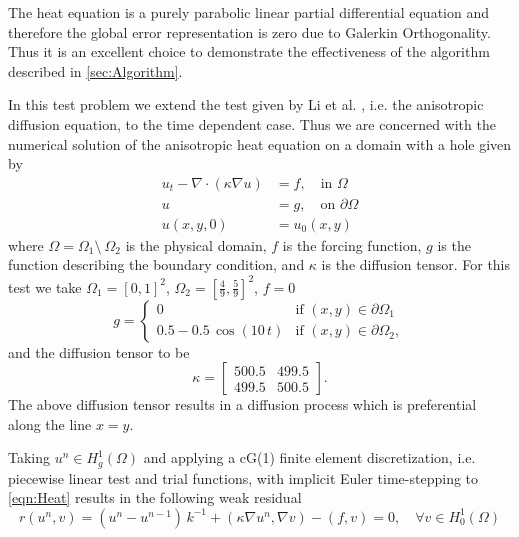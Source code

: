 \begin{test} \label{tst:Heat}
  The heat equation is a purely parabolic linear partial differential equation
  and therefore the global error representation is zero due to Galerkin
  Orthogonality.  Thus it is an excellent choice to demonstrate the
  effectiveness of the algorithm described in \autoref{sec:Algorithm}.

  In this test problem we extend the test given by Li et al.
  \cite[Example 5.1]{Li2010}, i.e. the anisotropic diffusion equation, to the
  time dependent case. Thus we are concerned with the numerical solution of the
  anisotropic heat equation on a domain with a hole given by
  \begin{equation} \label{eqn:Heat}
    \begin{split}
      u_t - \nabla \cdot (\kappa \nabla u) &= f, \quad \text{in } \Omega \\
      u &= g, \quad \text{on } \partial \Omega \\
      u(x,y,0) &= u_0(x,y)
    \end{split}
  \end{equation}
  where $\Omega = \Omega_1\setminus~\Omega_2$ is the physical domain, $f$ is the
  forcing function, $g$ is the function describing the boundary condition, and
  $\kappa$ is the diffusion tensor. For this test we take $\Omega_1 = [0,
  1]^2$, $\Omega_2 = [\frac{4}{9}, \frac{5}{9}]^2$, $f = 0$
  \begin{equation}
    g = \begin{cases}
        0 & \text{if } (x,y) \in \partial \Omega_1 \\
        0.5 - 0.5\, \cos(10\, t) & \text{if } (x,y) \in \partial \Omega_2,
    \end{cases}
    \label{eqn:BCFunction}
  \end{equation}
  and the diffusion tensor to be
  \begin{equation}
    \kappa = \begin{bmatrix} 500.5 & 499.5 \\ 499.5 & 500.5 \end{bmatrix}.
    \label{eqn:DiffusionTensor}
  \end{equation}
  The above diffusion tensor results in a diffusion process which is
  preferential along the line $x = y$.

  Taking $u^n \in H^1_g(\Omega)$ and applying a cG(1) finite element
  discretization, i.e. piecewise linear test and trial functions, with implicit
  Euler time-stepping to \eqref{eqn:Heat} results in the following weak residual
  \begin{equation}
    r(u^n, v) = (u^n - u^{n-1})\, k^{-1} + (\kappa \nabla u^n, \nabla v)
      - (f, v) = 0, \quad \forall v \in H^1_0(\Omega)
    \label{eqn:HeatWeak}
  \end{equation}
\end{test}

